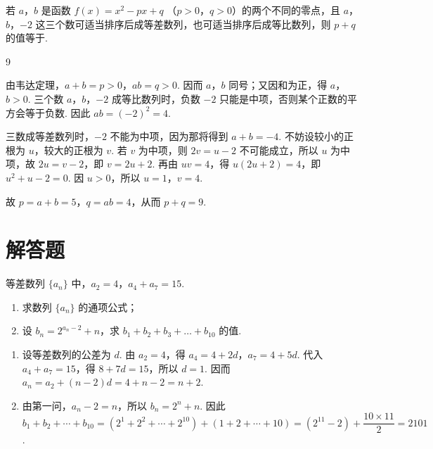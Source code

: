 \begin{problem}
若 \(a\)，\(b\) 是函数 \(f(x) = x^2 - px + q \) （\(p > 0\)，\(q > 0\)）的两个不同的零点，且 \(a\)，\(b\)，\(-2\) 这三个数可适当排序后成等差数列，也可适当排序后成等比数列，则 \(p + q\) 的值等于\fillinblank{}.
\end{problem}

\begin{answer}
9
\end{answer}

\begin{solution}
由韦达定理，\(a+b=p>0\)，\(ab=q>0\). 因而 \(a\)，\(b\) 同号；又因和为正，得 \(a\)，\(b>0\). 三个数 \(a\)，\(b\)，\(-2\) 成等比数列时，负数 \(-2\) 只能是中项，否则某个正数的平方会等于负数. 因此 \(ab=(-2)^2=4\).

三数成等差数列时，\(-2\) 不能为中项，因为那将得到 \(a+b=-4\). 不妨设较小的正根为 \(u\)，较大的正根为 \(v\). 若 \(v\) 为中项，则 \(2v=u-2\) 不可能成立，所以 \(u\) 为中项，故 \(2u=v-2\)，即 \(v=2u+2\). 再由 \(uv=4\)，得 \(u(2u+2)=4\)，即 \(u^2+u-2=0\). 因 \(u>0\)，所以 \(u=1\)，\(v=4\).

故 \(p=a+b=5\)，\(q=ab=4\)，从而 \(p+q=9\).
\end{solution}

\section{解答题}

\begin{problem}
等差数列 \(\{a_{n}\}\) 中，\(a_{2} = 4\)，\(a_{4} + a_{7} = 15\).

\begin{enumerate}
\item 求数列 \(\{a_{n}\}\) 的通项公式；
\item 设 \(b_{n} = 2^{a_{n} - 2} + n\)，求 \(b_{1} + b_{2} + b_{3} + \dots + b_{10}\) 的值.
\end{enumerate}
\end{problem}

\begin{solution}
\begin{enumerate}
\item 设等差数列的公差为 \(d\). 由 \(a_2=4\)，得 \(a_4=4+2d\)，\(a_7=4+5d\). 代入 \(a_4+a_7=15\)，得 \(8+7d=15\)，所以 \(d=1\). 因而 \(a_n=a_2+(n-2)d=4+n-2=n+2\).
\item 由第一问，\(a_n-2=n\)，所以 \(b_n=2^n+n\). 因此
\(b_1+b_2+\cdots+b_{10}=(2^1+2^2+\cdots+2^{10})+(1+2+\cdots+10)=(2^{11}-2)+\dfrac{10\times11}{2}=2101\).
\end{enumerate}
\end{solution}

